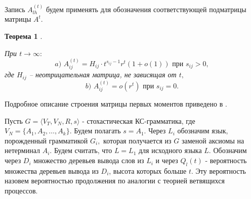 \documentclass[%
11pt,a4paper]{article}
\begin{document}
{%

Запись $A_{lh}^{(t)}$ будем применять для обозначения соответствующей подматрицы  матрицы $A^t.$

\medskip

\textbf{Теорема 1} \cite{zhil3}.
{\label{zhilteo1}
{\em При $t\rightarrow \infty:$ 
$$
a)\,\,A_{ij}^{(t)}=H_{ij} \cdot t^{s_{ij}-1} r^t (1+o(1)) \,\,\mbox {при} \,\, s_{ij}>0,  
$$
где $H_{ij}$ -- неотрицательная матрица, не зависящая от $t,$
$$
b)\,\, A_{ij}^{(t)}=o(r^t)\,\, \mbox {при} \,\, s_{ij}=0. 
$$

}


Подробное описание строения матрицы первых моментов приведено в \cite{zhil3}. 

\medskip

Пусть $G=\langle V_T,V_N,R,s\rangle$ - стохастическая КС-грамматика, где $V_N=\{A_1,A_2,\ldots,A_k \}.$ 
Будем полагать $s=A_1.$ 
Через $L_i$ обозначим язык, порожденный грамматикой $G_i,$ которая получается из $G$ заменой аксиомы на нетерминал $A_i.$ Будем считать, что $L=L_1$ для исходного языка $L.$
Обозначим через $D_i$ множество деревьев вывода слов из $L_i$ и через $Q_l(t)$ - вероятность множества деревьев вывода из $D_i$, высота которых больше $t.$
Эту вероятность назовем вероятностью продолжения по аналогии с теорией ветвящихся процессов.

}}
\end{document}
